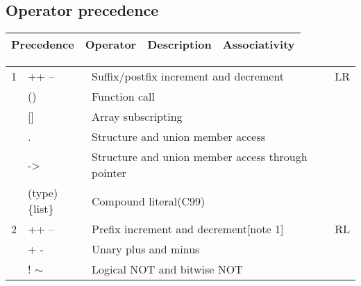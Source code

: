 \documentclass{extarticle}
\begin{document}
\subsection{Operator precedence}

\begin{tabular}{|l|l|l|l|}
\hline
Precedence     & Operator                                              & Description                                                            & Associativity \\ \hline
\end{tabular}


\begin{tabular}{|l|l|l|l|}
\hline
     &                                               &                                                             &  \\ \hline
1              & ++ --                                                 & Suffix/postfix increment and decrement                                 & LR            \\
               & ()                                                    & Function call                                                          &               \\
               & {[}{]}                                                & Array subscripting                                                     &               \\
               & .                                                     & Structure and union member access                                      &               \\
               & -\textgreater{}                                       & Structure and union member access through pointer                      &               \\
               & (type)\{list\}                                        & Compound literal(C99)                                                  &               \\ \hline
2              & ++ --                                                 & Prefix increment and decrement{[}note 1{]}                             & RL            \\
               & + -                                                   & Unary plus and minus                                                   &               \\
               & ! $\sim$                                              & Logical NOT and bitwise NOT                                            &               \\

\end{tabular}
\end{document}

